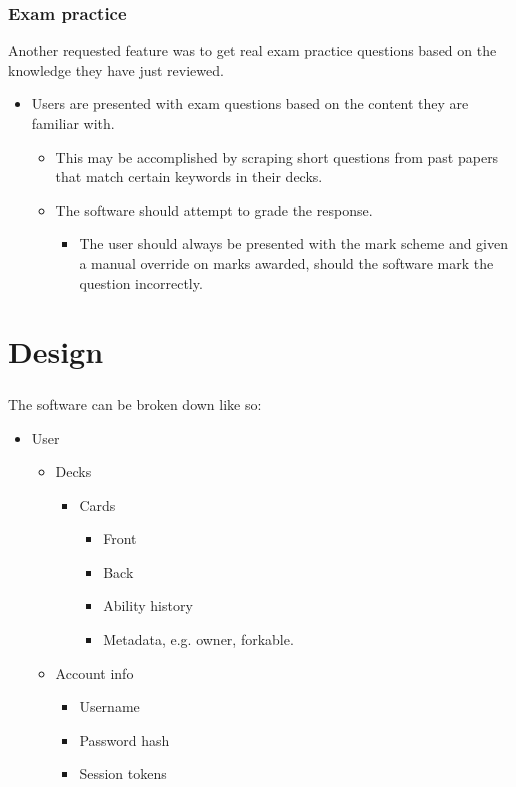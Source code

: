 \documentclass{report}
\begin{document}
\subsection{Exam practice}
Another requested feature was to get real exam practice questions based on the knowledge they have just reviewed.
\begin{itemize}
  \item Users are presented with exam questions based on the content they are familiar with.
  \begin{itemize}
    \item This may be accomplished by scraping short questions from past papers that match certain keywords in their decks.
    \item The software should attempt to grade the response.
    \begin{itemize}
      \item The user should always be presented with the mark scheme and given a manual override on marks awarded, should the software mark the question incorrectly.
    \end{itemize}
  \end{itemize}
\end{itemize}

\chapter{Design}
\paragraph{}
The software can be broken down like so:

\begin{itemize}
  \item User \begin{itemize}
    \item Decks \begin{itemize}
      \item Cards \begin{itemize}
        \item Front
        \item Back
        \item Ability history
        \item Metadata, e.g. owner, forkable.
      \end{itemize}
    \end{itemize}
    \item Account info \begin{itemize}
      \item Username
      \item Password hash
      \item Session tokens
    \end{itemize}
  \end{itemize}
\end{itemize}
\end{document}
